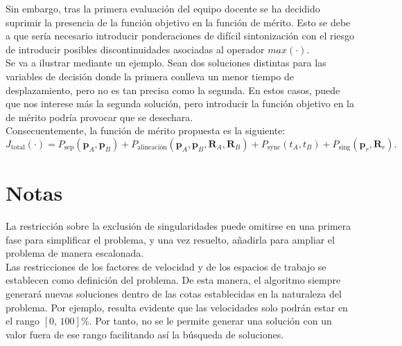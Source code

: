 Sin embargo, tras la primera evaluación del equipo docente se ha decidido suprimir la 
presencia de la función objetivo en la función de mérito. Esto se debe a que sería necesario 
introducir ponderaciones de difícil sintonización con el riesgo de introducir posibles 
discontinuidades asociadas al operador $max(⋅)$. \\

Se va a ilustrar mediante un ejemplo. Sean dos soluciones distintas para las variables de decisión donde
la primera conlleva un menor tiempo de desplazamiento, pero no es tan precisa como la segunda. 
En estos casos, puede que nos interese más la segunda solución, pero introducir la función 
objetivo en la de mérito podría provocar que se desechara. \\

Consecuentemente, la función de mérito propuesta es la siguiente: 
\[
  J_{\text{total}}(\cdot)
  = P_{\text{sep}}(\mathbf{p}_A,\mathbf{p}_B)
  + P_{\text{alineación}}(\mathbf{p}_A,\mathbf{p}_B,\mathbf{R}_A,\mathbf{R}_B)
  + P_{\text{sync}}(t_A,t_B)
  + P_{\text{sing}}(\mathbf{p}_r,\mathbf{R}_r).
\]

\section*{Notas}
La restricción sobre la exclusión de singularidades puede omitirse en una primera fase para 
simplificar el problema, y una vez resuelto, añadirla para ampliar el problema de manera 
escalonada. \\

Las restricciones de los factores de velocidad y de los espacios de trabajo se establecen como
definición del problema. De esta manera, el algoritmo siempre generará nuevas soluciones 
dentro de las cotas establecidas en la naturaleza del problema. Por ejemplo, resulta evidente 
que las velocidades solo podrán estar en el rango $[0,\, 100] \%$. Por tanto, no se le permite generar
una solución con un valor fuera de ese rango facilitando así la búsqueda de soluciones. \\

